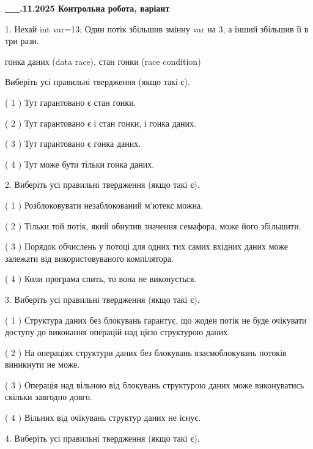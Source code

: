 \documentclass[12pt, ukrainian]{article}
\begin{document}
\newpage
\begin {large}

\textbf{\_\_.11.2025 Контрольна робота, варіант  }\par


{
1. Нехай int var=13; Один потік збільшив змінну var на 3, а інший збільшив її в три рази.

гонка даних (data race), стан гонки (race condition)

Виберіть усі правильні твердження (якщо такі є).\par
\vspace{2mm}
( 1 ) Тут гарантовано є стан гонки.%

( 2 ) Тут гарантовано є і стан гонки, і гонка даних.%

( 3 ) Тут гарантовано є гонка даних.%

( 4 ) Тут може бути тільки гонка даних.%


2. Виберіть усі правильні твердження (якщо такі є).\par
\vspace{2mm}

( 1 ) Розблоковувати незаблокований м’ютекс можна.%

( 2 ) Тільки той потік, який обнулив значення семафора, може його збільшити.%

( 3 ) Порядок обчислень у потоці для одних тих самих вхідних даних може залежати від використовуваного компілятора.%

( 4 ) Коли програма спить, то вона не виконується.%


3. Виберіть усі правильні твердження (якщо такі є).\par
\vspace{2mm}

( 1 ) Структура даних без блокувань гарантує, що жоден потік не буде очікувати доступу до виконання операцій над цією структурою даних.%

( 2 ) На операціях структури даних без блокувань взаємоблокувань потоків виникнути не може.%

( 3 ) Операція над вільною від блокувань структурою даних може виконуватись скільки завгодно довго.%

( 4 ) Вільних від очікувань структур даних не існує.%


4. Виберіть усі правильні твердження (якщо такі є).\par
\vspace{2mm}

}
\end{large}
\end{document}
